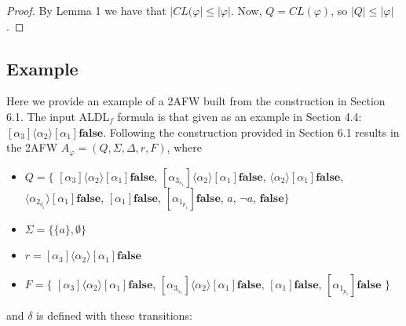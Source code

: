 \documentclass{lmcs}
\theoremstyle{definition}
\newcommand{\dbox}[1]{\langle #1 \rangle}
\newcommand{\bbox}[1]{[ #1 ]}
\DeclareMathOperator{\?}{?}
\begin{document}
\begin{proof}
  By Lemma 1 we have that $|CL(\varphi| \leq |\varphi|$. Now, $Q = CL(\varphi)$, so $|Q| \leq |\varphi|$.
\end{proof}

\subsection{Example}

Here we provide an example of a 2AFW built from the construction in Section 6.1. The input ALDL$_f$ formula is that given as an example in Section 4.4: $\bbox{\alpha_3}\dbox{\alpha_2}\bbox{\alpha_1}\textbf{false}$. Following the construction provided in Section 6.1 results in the 2AFW $A_\varphi = (Q, \Sigma, \Delta, r, F)$, where

\begin{itemize}
\item $Q = \{$
    $\bbox{\alpha_3}\dbox{\alpha_2}\bbox{\alpha_1}\textbf{false}$,
    $\bbox{\alpha_{3_{s_1}}}\dbox{\alpha_2}\bbox{\alpha_1}\textbf{false}$,
    $\dbox{\alpha_2}\bbox{\alpha_1}\textbf{false}$,
    $\dbox{\alpha_{2_{q_1}}}\bbox{\alpha_1}\textbf{false}$,
    $\bbox{\alpha_1}\textbf{false}$,
    $\bbox{\alpha_{1_{p_1}}}\textbf{false}$,
    $a$,
    $\neg a$,
    $\textbf{false}\}$

    \item $\Sigma = \{ \{a\}, \emptyset\}$

    \item $r = \bbox{\alpha_3}\dbox{\alpha_2}\bbox{\alpha_1}\textbf{false}$

    \item $F = \{$
      $\bbox{\alpha_3}\dbox{\alpha_2}\bbox{\alpha_1}\textbf{false}$,
      $\bbox{\alpha_{3_{s_1}}}\dbox{\alpha_2}\bbox{\alpha_1}\textbf{false}$,
      $\bbox{\alpha_1}\textbf{false}$,
      $\bbox{\alpha_{1_{p_1}}}\textbf{false}$
      $\}$
\end{itemize}

and $\delta$ is defined with these transitions:
\end{document}
